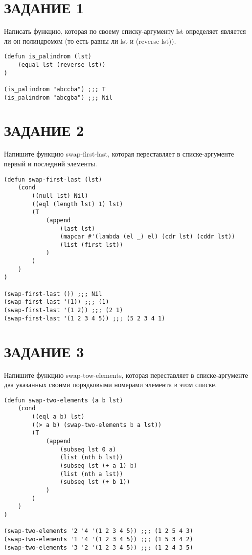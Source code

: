 \section{ЗАДАНИЕ 1}

Написать функцию, которая по своему списку-аргументу lst определяет является ли
он полиндромом (то есть равны ли lst и (reverse lst)).

\begin{lstlisting}
(defun is_palindrom (lst)
    (equal lst (reverse lst))
)

(is_palindrom "abccba") ;;; T
(is_palindrom "abcgba") ;;; Nil
\end{lstlisting}

\section{ЗАДАНИЕ 2}

Напишите функцию swap-first-last, которая переставляет в списке-аргументе
первый и последний элементы.

\begin{lstlisting}
(defun swap-first-last (lst)
    (cond
        ((null lst) Nil)
        ((eql (length lst) 1) lst)
        (T
            (append
                (last lst)
                (mapcar #'(lambda (el _) el) (cdr lst) (cddr lst))
                (list (first lst))
            )
        )
    )
)

(swap-first-last ()) ;;; Nil
(swap-first-last '(1)) ;;; (1)
(swap-first-last '(1 2)) ;;; (2 1)
(swap-first-last '(1 2 3 4 5)) ;;; (5 2 3 4 1)
\end{lstlisting}

\section{ЗАДАНИЕ 3}

Напишите функцию swap-tow-elements, которая переставляет в списке-аргументе
два указанных своими порядковыми номерами элемента в этом списке.

\begin{lstlisting}
(defun swap-two-elements (a b lst)
    (cond
        ((eql a b) lst)
        ((> a b) (swap-two-elements b a lst))
        (T
            (append
                (subseq lst 0 a)
                (list (nth b lst))
                (subseq lst (+ a 1) b)
                (list (nth a lst))
                (subseq lst (+ b 1))
            )
        )
    )
)

(swap-two-elements '2 '4 '(1 2 3 4 5)) ;;; (1 2 5 4 3)
(swap-two-elements '1 '4 '(1 2 3 4 5)) ;;; (1 5 3 4 2)
(swap-two-elements '3 '2 '(1 2 3 4 5)) ;;; (1 2 4 3 5)
\end{lstlisting}

